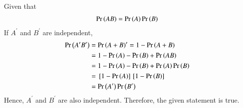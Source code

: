 Given that 
\begin{align}
\Pr\left(AB\right) = \Pr\left(A\right)\Pr\left(B\right)
\end{align}
If $A^{\prime}$  and $B^{\prime}$ are independent,
\begin{align}
	\Pr\left(A^{\prime} B^{\prime}\right) &= \Pr\left(A+B\right)^{\prime}
	=1 - \Pr\left(A+B\right)
	\\
	&= 1 - \Pr\left(A\right)
	 - \Pr\left(B\right) +  \Pr\left(AB\right)
	 \\
	&= 1 - \Pr\left(A\right)
	 - \Pr\left(B\right) +  \Pr\left(A\right)\Pr\left(B\right)
	 \\
	&= {}\left[1 - \Pr\left(A\right)\right]
	{}\left[ 1 - \Pr\left(B\right)\right]  
	\\
	&=
\Pr\left(A^{\prime}\right) 
\Pr\left(B^{\prime}\right) 
\end{align}
Hence, $A^{\prime}$ and $B^{\prime}$ are also independent. 
Therefore, the given statement is true.

